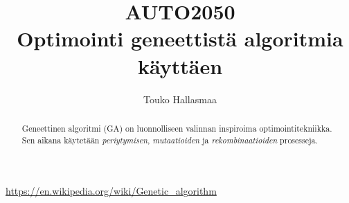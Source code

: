\documentclass[12pt]{article}
\title{\normalsize\uppercase{auto2050}\\\Huge Optimointi geneettistä algoritmia käyttäen}
\author{Touko Hallasmaa}
\date{}
\begin{document}
\maketitle
\tableofcontents

\begin{abstract}
Geneettinen algoritmi (GA) on luonnolliseen valinnan inspiroima optimointitekniikka.
Sen aikana käytetään \textit{periytymisen}, \textit{mutaatioiden} ja \textit{rekombinaatioiden}
prosesseja.
\end{abstract}






\begin{thebibliography}{9}

	\url{https://en.wikipedia.org/wiki/Genetic_algorithm}


\end{thebibliography}
\end{document}
